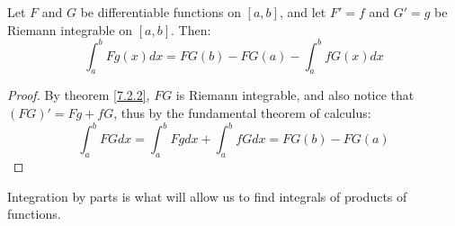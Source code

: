 \begin{theorem}\label{7.3.3}
    Let $F$ and  $G$ be differentiable functions on  $[a,b]$, and let  $F'=f$
    and  $G'=g$  be Riemann integrable on $ [a,b]$. Then:
        \begin{equation}
            \int_{a}^{b}{Fg(x) dx}=FG(b)-FG(a)-\int_{a}^{b}{fG(x) dx}		
        \end{equation}
\end{theorem}
\begin{proof}
    By theorem \ref{7.2.2},  $FG$ is Riemann integrable, and also notice that
    $(FG)'=Fg+fG$, thus by the fundamental theorem of calculus:
        \begin{equation*}
            \int_{a}^{b}{FG dx}=\int_{a}^{b}{Fg dx}+\int_{a}^{b}{fG dx}=FG(b)-FG(a)
        \end{equation*} 
\end{proof}
\begin{remark}
    Integration by parts is what will allow us to find integrals of products of
    functions.
\end{remark}
